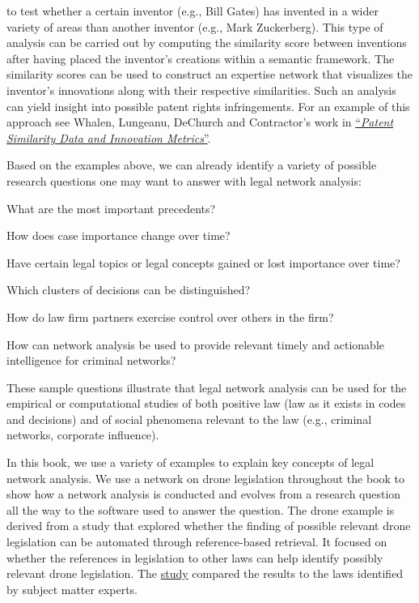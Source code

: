 \begin{itemize}
  to test whether a certain inventor (e.g., Bill Gates) has invented in
  a wider variety of areas than another inventor (e.g., Mark
  Zuckerberg). This type of analysis can be carried out by computing the
  similarity score between inventions after having placed the inventor's
  creations within a semantic framework. The similarity scores can be
  used to construct an expertise network that visualizes the inventor's
  innovations along with their respective similarities. Such an analysis
  can yield insight into possible patent rights infringements. For an
  example of this approach see Whalen, Lungeanu, DeChurch and
  Contractor's work in
  \href{https://doi.org/10.1111/jels.12261}{``\emph{Patent Similarity
  Data and Innovation Metrics}''}.
\end{itemize}

Based on the examples above, we can already identify a variety of
possible research questions one may want to answer with legal network
analysis:

What are the most important precedents?

How does case importance change over time?

Have certain legal topics or legal concepts gained or lost importance
over time?

Which clusters of decisions can be distinguished?

How do law firm partners exercise control over others in the firm?

How can network analysis be used to provide relevant timely and
actionable intelligence for criminal networks?

These sample questions illustrate that legal network analysis can be
used for the empirical or computational studies of both positive law
(law as it exists in codes and decisions) and of social phenomena
relevant to the law (e.g., criminal networks, corporate influence).

In this book, we use a variety of examples to explain key concepts of
legal network analysis. We use a network on drone legislation throughout
the book to show how a network analysis is conducted and evolves from a
research question all the way to the software used to answer the
question. The drone example is derived from a study that explored
whether the finding of possible relevant drone legislation can be
automated through reference-based retrieval. It focused on whether the
references in legislation to other laws can help identify possibly
relevant drone legislation. The
\href{https://www.mdpi.com/2504-446X/7/8/490}{study} compared the
results to the laws identified by subject matter experts.

